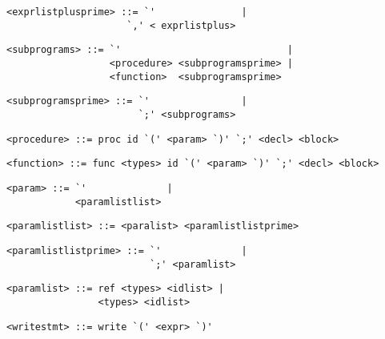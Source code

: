 \begin{footnotesize}
\begin{lstlisting}[frame=single, label={exprlistplusprime}, language=pie]
<exprlistplusprime> ::= `'               |
                     `,' < exprlistplus>
\end{lstlisting}

\begin{lstlisting}[frame=single, label={subprograms}, language=pie]
<subprograms> ::= `'                             |
                  <procedure> <subprogramsprime> |
                  <function>  <subprogramsprime>
\end{lstlisting}

\begin{lstlisting}[frame=single, label={subprogramsprime}, language=pie]
<subprogramsprime> ::= `'                |
                       `;' <subprograms>
\end{lstlisting}

\begin{lstlisting}[frame=single, label={procedure}, language=pie]
<procedure> ::= proc id `(' <param> `)' `;' <decl> <block>
\end{lstlisting}

\begin{lstlisting}[frame=single, label={function}, language=pie]
<function> ::= func <types> id `(' <param> `)' `;' <decl> <block>
\end{lstlisting}

\begin{lstlisting}[frame=single, label={param}, language=pie]
<param> ::= `'              |
            <paramlistlist>
\end{lstlisting}

\begin{lstlisting}[frame=single, label={paramlistlist}, language=pie]
<paramlistlist> ::= <paralist> <paramlistlistprime>
\end{lstlisting}

\begin{lstlisting}[frame=single, label={paramlistlistprime}, language=pie]
<paramlistlistprime> ::= `'              |
                         `;' <paramlist>
\end{lstlisting}

\begin{lstlisting}[frame=single, label={paramlist}, language=pie]
<paramlist> ::= ref <types> <idlist> |
                <types> <idlist>
\end{lstlisting}

\begin{lstlisting}[frame=single, label={writestmt}, language=pie]
<writestmt> ::= write `(' <expr> `)'
\end{lstlisting}


\end{footnotesize}
